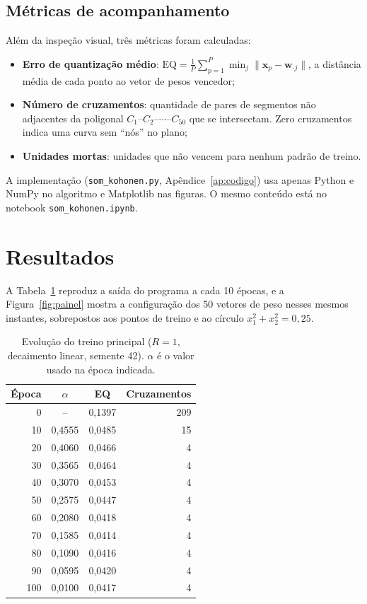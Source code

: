 \documentclass[12pt,a4paper,oneside]{article}
\newcommand{\EQ}{\mathrm{EQ}}
\begin{document}
\subsection{Métricas de acompanhamento}

Além da inspeção visual, três métricas foram calculadas:
\begin{itemize}
  \item \textbf{Erro de quantização médio}:
  $\EQ=\frac{1}{P}\sum_{p=1}^{P}\min_j\|\mathbf{x}_p-\mathbf{w}_{\cdot j}\|$,
  a distância média de cada ponto ao vetor de pesos vencedor;
  \item \textbf{Número de cruzamentos}: quantidade de pares de segmentos não
  adjacentes da poligonal $C_1$--$C_2$--$\cdots$--$C_{50}$ que se
  intersectam. Zero cruzamentos indica uma curva sem ``nós'' no plano;
  \item \textbf{Unidades mortas}: unidades que não vencem para nenhum padrão
  de treino.
\end{itemize}

A implementação (\texttt{som\_kohonen.py}, Apêndice~\ref{ap:codigo}) usa
apenas Python e NumPy no algoritmo e Matplotlib nas figuras. O mesmo
conteúdo está no notebook \texttt{som\_kohonen.ipynb}.

\section{Resultados}

A Tabela~\ref{tab:evolucao} reproduz a saída do programa a cada 10 épocas, e
a Figura~\ref{fig:painel} mostra a configuração dos 50 vetores de peso nesses
mesmos instantes, sobrepostos aos pontos de treino e ao círculo
$x_1^2+x_2^2=0{,}25$.

\begin{table}[H]
  \centering
  \caption{Evolução do treino principal ($R=1$, decaimento linear,
  semente 42). $\alpha$ é o valor usado na época indicada.}
  \label{tab:evolucao}
  \small
  \begin{tabular}{rccr}
    \toprule
    Época & $\alpha$ & EQ & Cruzamentos \\
    \midrule
      0 & --     & 0,1397 & 209 \\
     10 & 0,4555 & 0,0485 &  15 \\
     20 & 0,4060 & 0,0466 &   4 \\
     30 & 0,3565 & 0,0464 &   4 \\
     40 & 0,3070 & 0,0453 &   4 \\
     50 & 0,2575 & 0,0447 &   4 \\
     60 & 0,2080 & 0,0418 &   4 \\
     70 & 0,1585 & 0,0414 &   4 \\
     80 & 0,1090 & 0,0416 &   4 \\
     90 & 0,0595 & 0,0420 &   4 \\
    100 & 0,0100 & 0,0417 &   4 \\
    \bottomrule
  \end{tabular}
\end{table}
\end{document}
